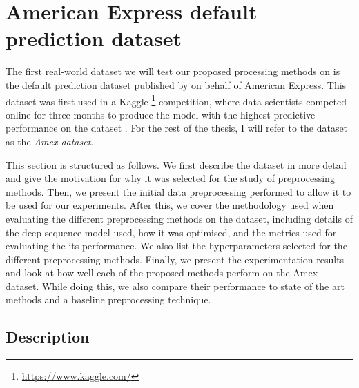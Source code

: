 \documentclass{statsmsc}
\begin{document}
{%
\section{American Express default prediction dataset}%
\label{sec:amex_data}%

The first real-world dataset we will test our proposed processing methods on is
the default prediction dataset published by \cite{amex-data} on behalf of
American Express.  This dataset was first used in a Kaggle%
\footnote{\url{https://www.kaggle.com/}} competition, where data scientists
competed online for three months to produce the model with the highest predictive performance
on the dataset
\citep{amex-data}.  For the rest of the thesis, I will refer to the dataset as
the \textit{Amex dataset}.

This section is structured as follows. We first describe the
dataset in more detail and give the motivation for why it was selected for the study of
preprocessing methods. Then, we present the initial data preprocessing performed to allow it to
be used for our experiments. After this, we
cover the  methodology used when evaluating the different preprocessing methods on
the dataset, including details of the deep sequence model used, how it was optimised, and
the metrics used for evaluating the its performance.
We also list the hyperparameters selected for the different preprocessing methods.
Finally, we present the experimentation results and look at how well each of the proposed methods
perform on the Amex dataset. While doing this, we also compare their performance to state of
the art methods and a baseline preprocessing technique.

\subsection{Description}%
\label{sub:Description}

}
\end{document}
